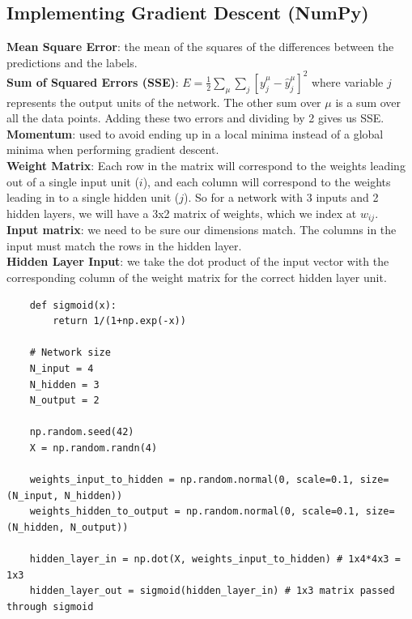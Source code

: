 \documentclass[11pt, a4paper]{article}
\begin{document}
\begin{spacing}{1.1}
	\subsection{Implementing Gradient Descent (NumPy)}
	\textbf{Mean Square Error}: the mean of the squares of the differences between the predictions and the labels.\vspace*{2mm}\\
	\textbf{Sum of Squared Errors (SSE)}: $E = \frac{1}{2} \sum_{\mu} \sum_j [y_j^{\mu} - \hat{y}_j^{\mu}]^2$ where variable $j$ represents the output units of the network. The other sum over $\mu$ is a sum over all the data points. Adding these two errors and dividing by 2 gives us SSE. \vspace*{2mm}\\	
	\textbf{Momentum}: used to avoid ending up in a local minima instead of a global minima when performing gradient descent.\vspace*{2mm}\\
	\textbf{Weight Matrix}: Each row in the matrix will correspond to the weights leading out of a single input unit ($i$), and each column will correspond to the weights leading in to a single hidden unit ($j$). So for a network with 3 inputs and 2 hidden layers, we will have a 3x2 matrix of weights, which we index at $w_{ij}$.\vspace*{2mm}\\
	\textbf{Input matrix}: we need to be sure our dimensions match. The columns in the input must match the rows in the hidden layer.\vspace*{2mm}\\
	\textbf{Hidden Layer Input}: we take the dot product of the input vector with the corresponding column of the weight matrix for the correct hidden layer unit. \newpage	

	\begin{lstlisting}
	def sigmoid(x):
		return 1/(1+np.exp(-x))
	
	# Network size
	N_input = 4
	N_hidden = 3
	N_output = 2
	
	np.random.seed(42)
	X = np.random.randn(4)
	
	weights_input_to_hidden = np.random.normal(0, scale=0.1, size=(N_input, N_hidden))
	weights_hidden_to_output = np.random.normal(0, scale=0.1, size=(N_hidden, N_output))
	
	hidden_layer_in = np.dot(X, weights_input_to_hidden) # 1x4*4x3 = 1x3
	hidden_layer_out = sigmoid(hidden_layer_in) # 1x3 matrix passed through sigmoid
	

\end{lstlisting}
\end{spacing}
\end{document}
